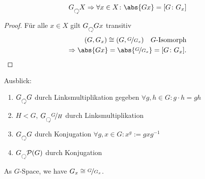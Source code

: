\begin{theorem}
	\begin{align*}
		G \Circlearrowleft X \implies \forall x \in X\colon \abs{Gx} = [G \colon G_x]
	\end{align*}
\end{theorem}
\begin{proof}
	Für alle $x \in X$ gilt $G \Circlearrowleft Gx$ transitiv
	\begin{align*}
		(G,G_x) \cong (G,\lnkset{G}{G_x}) \quad G\text{-Isomorph}\\
		\implies \abs{Gx} = \abs{\lnkset{G}{G_x}} = [G \colon G_x].
	\end{align*}
\end{proof}
Ausblick:\\
\begin{enumerate}
	\item $G \Circlearrowleft G$ durch Linksmultiplikation gegeben $\forall g,h \in G\colon g\cdot h = gh$
	\item $H< G$, $G \Circlearrowleft \lnkset{G}{H}$ durch Linksmultiplikation
	\item $G \Circlearrowleft G$ durch Konjugation $\forall g,x \in G \colon x^g := gxg^{-1}$
	\item $G \Circlearrowleft \powerset(G)$ durch Konjugation
\end{enumerate}
\begin{theorem}
	As $G$-Space, we have $G_x \cong \lnkset{G}{G_x}$.
\end{theorem}
